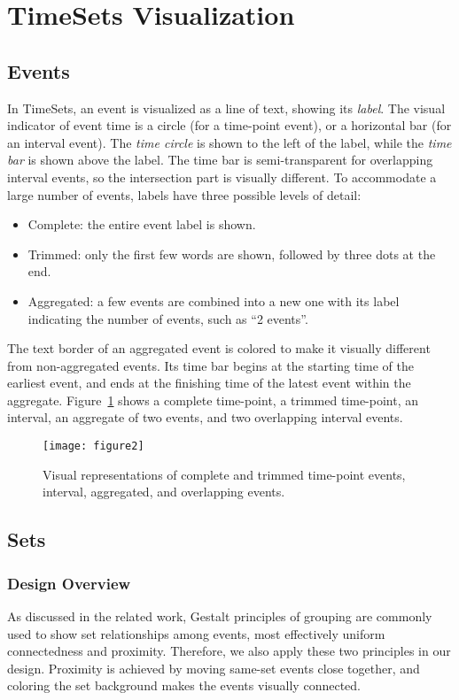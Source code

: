\section{TimeSets Visualization}

\subsection{Events}
In TimeSets, an event is visualized as a line of text, showing its \emph{label}. The visual indicator of event time is a circle (for a time-point event), or a horizontal bar (for an interval event). The \textit{time circle} is shown to the left of the label, while the \textit{time bar} is shown above the label. The time bar is semi-transparent for overlapping interval events, so the intersection part is visually different. To accommodate a large number of events, labels have three possible levels of detail: 
\begin{itemize}
	\item Complete: the entire event label is shown.
	\item Trimmed: only the first few words are shown, followed by three dots at the end.
	\item Aggregated: a few events are combined into a new one with its label indicating the number of events, such as ``2 events''.
\end{itemize}	
The text border of an aggregated event is colored to make it visually different from non-aggregated events. Its time bar begins at the starting time of the earliest event, and ends at the finishing time of the latest event within the aggregate. Figure~\ref{fig:event-representation} shows a complete time-point, a trimmed time-point, an interval, an aggregate of two events, and two overlapping interval events.

\begin{figure}[ht]
\centering
\texttt{[image: figure2]}
\caption{Visual representations of complete and trimmed time-point events, interval, aggregated, and overlapping events.}
\label{fig:event-representation}
\end{figure}

\subsection{Sets}
\subsubsection{Design Overview}
As discussed in the related work, Gestalt principles of grouping are commonly used to show set relationships among events, most effectively uniform connectedness and proximity. Therefore, we also apply these two principles in our design. Proximity is achieved by moving same-set events close together, and coloring the set background makes the events visually connected.

